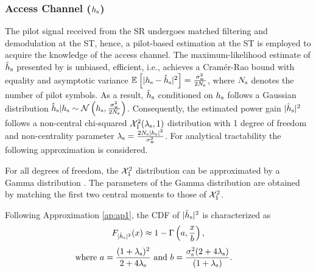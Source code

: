 \subsubsection*{Access Channel ($h_{\text{s}}$)}
The pilot signal received from the SR undergoes matched filtering and demodulation at the ST, hence, a pilot-based estimation at the ST is employed to acquire the knowledge of the access channel. The maximum-likelihood estimate of $\hat{h}_{\text{s}}$ presented by \cite{Gifford08} is unbiased, efficient, i.e., achieves a Cram\'er-Rao bound with equality and asymptotic variance ${\mathbb E}_{}\left[ |h_{\text{s}} -\hat{h}_{\text{s}}|^2 \right] = \frac{\sigma^2_{\text{w}}}{2 N_{\text{s}}}$, where $N_{\text{s}}$ denotes the number of pilot symbols. As a result, $\hat{h}_{\text{s}}$ conditioned on $h_{\text{s}}$ follows a Gaussian distribution
$\hat{h}_{\text{s}}|h_{\text{s}} \sim \mathcal{N}\left( h_{\text{s}},\frac{\sigma^2_{\text{w}}}{2 N_{\text{s}}} \right)$.
Consequently, the estimated power gain $|\hat{h}_{\text{s}}|^2$ follows a non-central chi-squared $\ncchi2(\ls, 1)$ distribution with 1 degree of freedom and non-centrality parameter $\lambda_{\text{s}} = \frac{2 N_{\text{s}} |h_{\text{s}}|^2}{\sigma^2_{\text{w}}}$. For analytical tractability the following approximation is considered. 
\begin{approxi} \label{ap:ap1}
\normalfont 
For all degrees of freedom, the $\ncchi2$ distribution can be approximated by a Gamma distribution \cite{abramo}. The parameters of the Gamma distribution are obtained by matching the first two central moments to those of $\ncchi2$.
\end{approxi}
Following Approximation \ref{ap:ap1}, the CDF of $|\hat{h}_{\text{s}}|^2$ is characterized as
\begin{align}
F_{|\hat{h}_{\text{s}}|^2}(x) \approx 1 - \Gamma \left(a, \frac{x}{b} \right) \label{eq:fephs}, 
\end{align}
\begin{align}
\text{where  } a = \frac{(1 + \lambda_{\text{s}})^2}{2 + 4 \lambda_{\text{s}}} &\text{ and } b = \frac{\sigma^2_{\text{s}} (2 + 4 \lambda_{\text{s}})}{(1 + \lambda_{\text{s}})}.  \label{eq:para_hs} 
\end{align}

